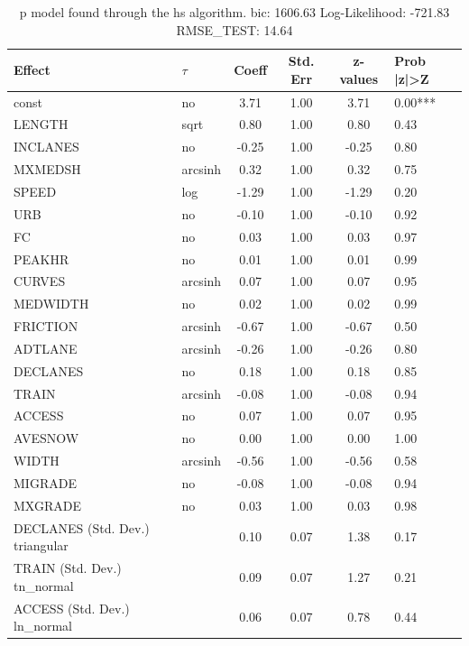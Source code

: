 \begin{table}
	\caption{p model found through the hs algorithm. bic: 1606.63 Log-Likelihood: -721.83 RMSE_TEST: 14.64}
	\begin{center}
		\begin{tabular}{|l|l|c|c|c|l|}
			\hline
			Effect & $\tau$ & Coeff & Std. Err & z-values & Prob |z|>Z \\
			\hline
			const & no & 3.71 & 1.00 & 3.71 & 0.00*** \\
			\hline
			LENGTH & sqrt & 0.80 & 1.00 & 0.80 & 0.43 \\
			\hline
			INCLANES & no & -0.25 & 1.00 & -0.25 & 0.80 \\
			\hline
			MXMEDSH & arcsinh & 0.32 & 1.00 & 0.32 & 0.75 \\
			\hline
			SPEED & log & -1.29 & 1.00 & -1.29 & 0.20 \\
			\hline
			URB & no & -0.10 & 1.00 & -0.10 & 0.92 \\
			\hline
			FC & no & 0.03 & 1.00 & 0.03 & 0.97 \\
			\hline
			PEAKHR & no & 0.01 & 1.00 & 0.01 & 0.99 \\
			\hline
			CURVES & arcsinh & 0.07 & 1.00 & 0.07 & 0.95 \\
			\hline
			MEDWIDTH & no & 0.02 & 1.00 & 0.02 & 0.99 \\
			\hline
			FRICTION & arcsinh & -0.67 & 1.00 & -0.67 & 0.50 \\
			\hline
			ADTLANE & arcsinh & -0.26 & 1.00 & -0.26 & 0.80 \\
			\hline
			DECLANES & no & 0.18 & 1.00 & 0.18 & 0.85 \\
			\hline
			TRAIN & arcsinh & -0.08 & 1.00 & -0.08 & 0.94 \\
			\hline
			ACCESS & no & 0.07 & 1.00 & 0.07 & 0.95 \\
			\hline
			AVESNOW & no & 0.00 & 1.00 & 0.00 & 1.00 \\
			\hline
			WIDTH & arcsinh & -0.56 & 1.00 & -0.56 & 0.58 \\
			\hline
			MIGRADE & no & -0.08 & 1.00 & -0.08 & 0.94 \\
			\hline
			MXGRADE & no & 0.03 & 1.00 & 0.03 & 0.98 \\
			\hline
			DECLANES (Std. Dev.) triangular &  & 0.10 & 0.07 & 1.38 & 0.17 \\
			\hline
			TRAIN (Std. Dev.) tn_normal &  & 0.09 & 0.07 & 1.27 & 0.21 \\
			\hline
			ACCESS (Std. Dev.) ln_normal &  & 0.06 & 0.07 & 0.78 & 0.44 \\

\end{tabular}
\end{center}
\end{table}
